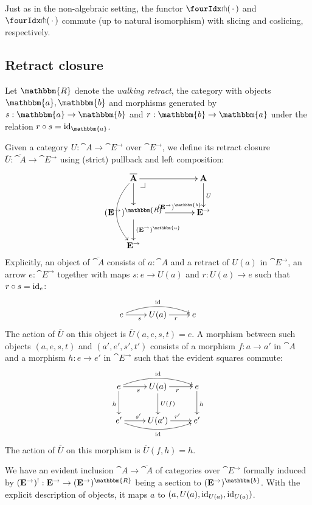 \documentclass[reqno,10pt,a4paper,oneside]{amsart}
\begin{document}
\begin{remark}
\label{pitchfork-slicing}
Just as in the non-algebraic setting, the functor $\liftr{\brarghole}$ and $\liftl{\brarghole}$ commute (up to natural isomorphism) with slicing and coslicing, respectively.
\end{remark}

\subsection{Retract closure}

\newcommand{\ret}{\mathbbm{R}}
\newcommand{\retA}{\mathbbm{a}}
\newcommand{\retB}{\mathbbm{b}}

Let $\ret$ denote the \emph{walking retract}, \ie the category with objects $\retA, \retB$ and morphisms generated by $s : \retA \to \retB$ and $r : \retB \to \retA$ under the relation $r \cc s = \id_{\retA}$.

Given a category $U : \cat{A} \to \cat{E}^{\to}$ over $\cat{E}^{\to}$, we define its retract closure $\overline{U} : \overline{\cat{A}} \to \cat{E}^{\to}$ using (strict) pullback and left composition:
\[
\xymatrix@C+1em{
  \overline{\cat{A}}
  \ar[r]
  \ar[d]
  \ar@/_2em/[dd]_{\overline{U}}
  \pullback{dr}
&
  \cat{A}
  \ar[d]^{U}
\\
  (\cat{E}^{\to})^{\ret}
  \ar[r]^-{(\cat{E}^{\to})^{\retB}}
  \ar[d]^{(\cat{E}^{\to})^{\retA}}
&
  \cat{E}^{\to}
\\
  \cat{E}^{\to}
}
\]
Explicitly, an object of $\overline{\cat{A}}$ consists of $a : \cat{A}$ and a retract of $U(a)$ in $\cat{E}^{\to}$, \ie an arrow $e : \cat{E}^{\to}$ together with maps $s : e \to U(a)$ and $r : U(a) \to e$ such that $r \mathbin{\circ} s = \operatorname{id}_e$:
\[
\xymatrix{
  e
  \ar[r]_{s}
  \ar@/^1em/[rr]^{\id}
&
  U(a)
  \ar[r]_{r}
&
  e
}
\]
The action of $\overline{U}$ on this object is $\overline{U}(a, e, s, t) = e$.
A morphism between such objects $(a, e, s, t)$ and $(a', e', s', t')$ consists of a morphism $f : a \to a'$ in $\cat{A}$ and a morphism $h : e \to e'$ in $\cat{E}^{\to}$ such that the evident squares commute:
\[
\xymatrix{
  e
  \ar[r]_{s}
  \ar@/^1em/[rr]^{\id}
  \ar[d]_{h}
&
  U(a)
  \ar[r]_{r}
  \ar[d]^{U(f)}
&
  e
  \ar[d]^{h}
\\
  e'
  \ar[r]^{s'}
  \ar@/_1em/[rr]_{\id}
&
  U(a')
  \ar[r]^{r'}
&
  e'
}
\]
The action of $\overline{U}$ on this morphism is $\overline{U}(f, h) = h$.

We have an evident inclusion $\cat{A} \to \overline{\cat{A}}$ of categories over $\cat{E}^{\to}$ formally induced by $(\cat{E}^{\to})^{\canonical} : \cat{E}^{\to} \to (\cat{E}^{\to})^{\ret}$ being a section to $(\cat{E}^{\to})^{\retB}$.
With the explicit description of objects, it maps $a$ to $(a, U(a), \operatorname{id}_{U(a)}, \operatorname{id}_{U(a)})$.
\end{document}
